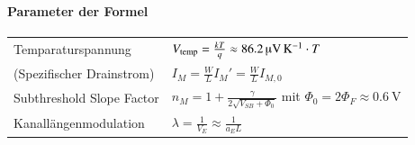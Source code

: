 



\paragraph{Parameter der Formel}

\renewcommand{\arraystretch}{1.5}
\begin{tabular}{ll}
    Temparaturspannung              & $V_{\rm temp} = \frac{k T}{q} \approx \qty{86.2}{\micro\volt\per\kelvin} \cdot T$                             \\
    (Spezifischer Drainstrom)       & $ I_M = \frac{W}{L} I_{M}' = \frac{W}{L} I_{M, 0}$                                                                                 \\
    Subthreshold Slope Factor       & $n_M = 1 + \frac{\gamma}{2\sqrt{V_{SB}+\Phi_0}}$ \quad mit \quad $\Phi_0 = 2 \Phi_F \approx \qty{0.6}{\volt}$ \\
    Kanallängenmodulation           & $\lambda = \frac{1}{V_E} \approx \frac{1}{a_E L}$
\end{tabular}
\renewcommand{\arraystretch}{1}




